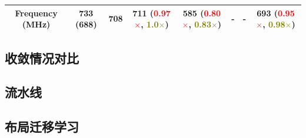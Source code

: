 \begin{table}[t]
\begin{adjustbox}{width=1.1\textwidth,center}
\begin{tabular}{c|c c| c c c c c}
  Frequency	(MHz)	 	 & 733  (688)   & 708 	 &711  (\textcolor{red}{0.97$\times$}, \textcolor{olive}{1.0$\times$})		        & 585 	(\textcolor{red}{0.80$\times$}, \textcolor{olive}{0.83$\times$})	& - 	      	                                                              & - 	                                                                           & 693 (\textcolor{red}{0.95$\times$}, \textcolor{olive}{0.98$\times$}) \\
	\bottomrule
	\end{tabular}
  \vspace{-0.2in}
\end{adjustbox}
\end{table}



\subsection{收敛情况对比}


\subsection{流水线}


\subsection{布局迁移学习}

